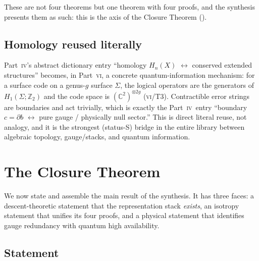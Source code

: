 \documentclass[12pt]{article}
\theoremstyle{definition}
\theoremstyle{remark}
\newcommand{\Sstat}{\textsf{S}}
\newcommand{\ZZ}{\mathbb{Z}}
\newcommand{\CC}{\mathbb{C}}
\newcommand{\PIV}{\textsc{iv}}
\newcommand{\PVI}{\textsc{vi}}
\begin{document}
These are not four theorems but one theorem with four proofs, and the synthesis
presents them as such: this is the axis of the Closure Theorem ().

\subsection{Homology reused literally}

Part~\PIV's abstract dictionary entry ``homology $H_n(X)$ $\leftrightarrow$ conserved
extended structures'' becomes, in Part~\PVI, a concrete quantum-information mechanism:
for a surface code on a genus-$g$ surface $\Sigma$, the logical operators are the
generators of $H_1(\Sigma;\ZZ_2)$ and the code space is $(\CC^2)^{\otimes 2g}$
(\PVI/T3).  Contractible error strings are boundaries and act trivially, which is exactly the
Part~\PIV\ entry ``boundary $c=\partial b$ $\leftrightarrow$ pure gauge / physically
null sector.''  This is direct literal reuse, not analogy, and it is the strongest
(status-\Sstat) bridge in the entire library between algebraic topology, gauge/stacks,
and quantum information.

\section{The Closure Theorem}
\label{sec:closure}

We now state and assemble the main result of the synthesis.  It has three faces: a
descent-theoretic statement that the representation stack \emph{exists}, an isotropy
statement that unifies its four proofs, and a physical statement that identifies gauge
redundancy with quantum high availability.

\subsection{Statement}
\end{document}
